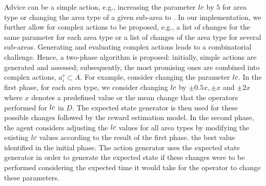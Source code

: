 Advice can be a simple action, e.g., increasing the parameter $lc$ by $5$ for area type  or changing the area type of a given sub-area to . In our implementation, we further allow for complex actions to be proposed, e.g., a list of changes for the same parameter for each area type or a list of changes of the area type for several sub-areas. 
Generating and evaluating complex actions leads to a combinatorial challenge.
Hence, a two-phase algorithm is proposed: initially, simple actions are generated and assessed; subsequently, the most promising ones are combined into complex actions, $a_i^v\subset A$.
For example, consider changing the parameter $lc$.  
In the first phase, for each area type, we consider changing $lc$ by    $\pm0.5x, \pm x$ and $\pm2x$ where $x$ denotes a predefined value or the mean change that the operators performed for $lc$ in $D$. The expected state generator is then used for these possible changes followed by the reward estimation model. 
In the second phase, the agent considers adjusting the $lc$ values for all area types by modifying the existing $lc$ values according to the result of the first phase. the best value identified in the initial phase. The action generator uses the expected state generator in order to generate the expected state if these changes were to be performed considering the expected time it would take for the operator to change these parameters. 




